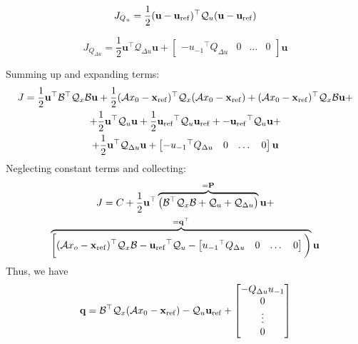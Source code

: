 \documentclass[a4paper,12pt,fleqn]{article}
\newcommand{\PQP}{\mathbf{P}}
\newcommand{\qQP}{\mathbf{q}}
\newcommand{\varxvec}{\mathbf{x}}
\newcommand{\varuvec}{\mathbf{u}}
\newcommand{\baru}{u_{-1}}
\begin{document}
\begin{equation}
 J_{Q_u} =  \frac{1}{2} (\varuvec - \varuvec_{\rm ref})^\top \mathcal{Q}_u (\varuvec-\varuvec_{\rm ref})
\end{equation}

\begin{equation}
 J_{Q_{\Delta u}} =  \frac{1}{2} \varuvec^\top \mathcal{Q}_{\Delta u} \varuvec +   
 \begin{bmatrix}
  -{\baru}^\top Q_{\Delta u} & 0 & \dots  & 0
 \end{bmatrix} \varuvec
\end{equation}

Summing up and expanding terms:
\begin{multline}
 J = 
 \frac{1}{2}\varuvec^\top \mathcal{B}^\top \mathcal{Q}_x \mathcal{B} \varuvec + 
 \frac{1}{2} (\mathcal{A}x_0 - \varxvec_{\rm ref})^\top \mathcal{Q}_x (\mathcal{A}x_0-\varxvec_{\rm ref}) +
 (\mathcal{A}x_0 -\varxvec_{\rm ref})^\top\mathcal{Q}_x \mathcal{B} \varuvec + \\
 + \frac{1}{2} \varuvec^\top \mathcal{Q}_u \varuvec +
 \frac{1}{2}{\varuvec_{\rm ref}}^\top \mathcal{Q}_u \varuvec_{\rm ref} + 
 -{\varuvec_{\rm ref}}^\top\mathcal{Q}_u \varuvec +\\ 
 +\frac{1}{2} \varuvec^\top \mathcal{Q}_{\Delta u} \varuvec +
\begin{bmatrix}
  -{\baru}^\top Q_{\Delta u} & 0 & \dots  & 0
 \end{bmatrix} \varuvec 
\end{multline}
Neglecting constant terms and collecting:
\begin{multline}
 J = C + \frac{1}{2} \varuvec^\top \overbrace{\big(\mathcal{B}^\top \mathcal{Q}_x \mathcal{B} + \mathcal{Q}_u + \mathcal{Q}_{\Delta u}\big)} ^{=\PQP}\varuvec + \\
 \overbrace{\bigg [(\mathcal{A}x_o - \varxvec_{\rm ref})^\top \mathcal{Q}_x \mathcal{B} -{\varuvec_{\rm ref}}^\top\mathcal{Q}_u -
 \begin{bmatrix}
  {\baru}^\top Q_{\Delta u} & 0 & \dots  & 0
 \end{bmatrix}\bigg)}^{=\qQP^\top} \varuvec
\end{multline}
Thus, we have
\begin{equation}
 \qQP = \mathcal{B}^\top \mathcal{Q}_x(\mathcal{A}x_0 - \varxvec_{\rm ref}) - \mathcal{Q}_u\varuvec_{\rm ref} + 
  \begin{bmatrix}
 -Q_{\Delta u} \baru \\ 0 \\ \vdots \\0
 \end{bmatrix}
\end{equation}
\end{document}
